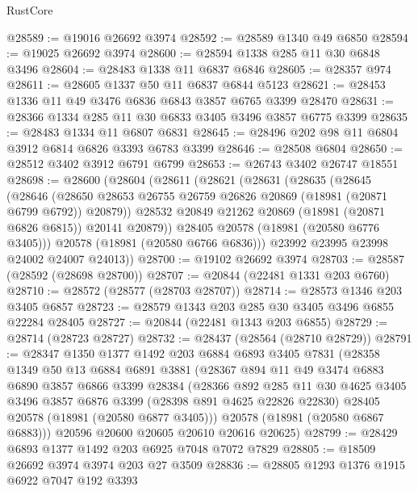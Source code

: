 \begin{lexlean}{RustCore}
\begin{coremodule}
@28589 := @19016 @26692 @3974
@28592 := @28589 @1340 @49 @6850
@28594 := @19025 @26692 @3974
@28600 := @28594 @1338 @285 @11 @30 @6848 @3496
@28604 := @28483 @1338 @11 @6837 @6846
@28605 := @28357 @974
@28611 := @28605 @1337 @50 @11 @6837 @6844 @5123
@28621 := @28453 @1336 @11 @49 @3476 @6836 @6843 @3857 @6765 @3399 @28470
@28631 := @28366 @1334 @285 @11 @30 @6833 @3405 @3496 @3857 @6775 @3399
@28635 := @28483 @1334 @11 @6807 @6831
@28645 := @28496 @202 @98 @11 @6804 @3912 @6814 @6826 @3393 @6783 @3399
@28646 := @28508 @6804
@28650 := @28512 @3402 @3912 @6791 @6799
@28653 := @26743 @3402 @26747 @18551
@28698 := @28600
    (@28604
      (@28611
        (@28621
          (@28631
            (@28635
              (@28645
                (@28646
                  (@28650 @28653 @26755 @26759 @26826 @20869 (@18981 (@20871 @6799 @6792)) @20879))
                @28532
                @20849
                @21262
                @20869
                (@18981 (@20871 @6826 @6815))
                @20141
                @20879))
            @28405
            @20578
            (@18981 (@20580 @6776 @3405)))
          @20578
          (@18981 (@20580 @6766 @6836)))
        @23992
        @23995
        @23998
        @24002
        @24007
        @24013))
@28700 := @19102 @26692 @3974
@28703 := @28587 (@28592 (@28698 @28700))
@28707 := @20844 (@22481 @1331 @203 @6760)
@28710 := @28572 (@28577 (@28703 @28707))
@28714 := @28573 @1346 @203 @3405 @6857
@28723 := @28579 @1343 @203 @285 @30 @3405 @3496 @6855 @22284 @28405
@28727 := @20844 (@22481 @1343 @203 @6855)
@28729 := @28714 (@28723 @28727)
@28732 := @28437 (@28564 (@28710 @28729))
@28791 := @28347
    @1350
    @1377
    @1492
    @203
    @6884
    @6893
    @3405
    @7831
    (@28358
      @1349
      @50
      @13
      @6884
      @6891
      @3881
      (@28367
        @894
        @11
        @49
        @3474
        @6883
        @6890
        @3857
        @6866
        @3399
        @28384
        (@28366
          @892
          @285
          @11
          @30
          @4625
          @3405
          @3496
          @3857
          @6876
          @3399
          (@28398 @891 @4625 @22826 @22830)
          @28405
          @20578
          (@18981 (@20580 @6877 @3405)))
        @20578
        (@18981 (@20580 @6867 @6883)))
      @20596
      @20600
      @20605
      @20610
      @20616
      @20625)
@28799 := @28429 @6893 @1377 @1492 @203 @6925 @7048 @7072 @7829
@28805 := @18509 @26692 @3974 @3974 @203 @27 @3509
@28836 := @28805
    @1293
    @1376
    @1915
    @6922
    @7047
    @192
    @3393

\end{coremodule}
\end{lexlean}
